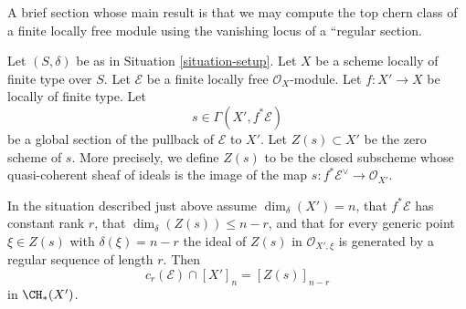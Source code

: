 \noindent
A brief section whose main result is that we may compute the
top chern class of a finite locally free module using the
vanishing locus of a ``regular section.

\medskip\noindent
Let $(S, \delta)$ be as in Situation \ref{situation-setup}. Let $X$ be a scheme
locally of finite type over $S$. Let $\mathcal{E}$ be a finite locally
free $\mathcal{O}_X$-module. Let $f : X' \to X$ be locally of finite type. Let
$$
s \in \Gamma(X', f^*\mathcal{E})
$$
be a global section of the pullback of $\mathcal{E}$ to $X'$. Let
$Z(s) \subset X'$ be the zero scheme of $s$. More precisely, we define
$Z(s)$ to be the closed subscheme whose quasi-coherent sheaf
of ideals is the image of the map
$s : f^*\mathcal{E}^\vee \to \mathcal{O}_{X'}$.

\begin{lemma}
\label{lemma-top-chern-class}
In the situation described just above assume $\dim_\delta(X') = n$,
that $f^*\mathcal{E}$ has constant rank $r$, that
$\dim_\delta(Z(s)) \leq n - r$, and that for every generic point
$\xi \in Z(s)$ with $\delta(\xi) = n - r$ the ideal of $Z(s)$
in $\mathcal{O}_{X', \xi}$ is generated by a regular sequence
of length $r$. Then
$$
c_r(\mathcal{E}) \cap [X']_n = [Z(s)]_{n - r}
$$
in $\CH_*(X')$.
\end{lemma}


